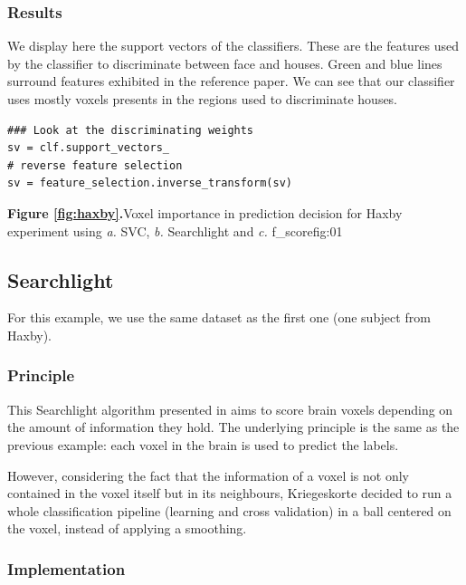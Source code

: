 \documentclass{frontiersSCNS} %
\begin{document}

\subsubsection{Results}

We display here the support vectors of the classifiers. These are the features
used by the classifier to discriminate between face and houses. Green and blue
lines surround features exhibited in the reference paper. We can see that our
classifier uses mostly voxels presents in the regions used to discriminate
houses.

\begin{lstlisting}
### Look at the discriminating weights
sv = clf.support_vectors_
# reverse feature selection
sv = feature_selection.inverse_transform(sv)
\end{lstlisting}

\textbf{Figure \ref{fig:haxby}.}{Voxel importance in prediction decision for Haxby experiment
using \textit{a.} SVC, \textit{b.} Searchlight and \textit{c.} f\_score}{fig:01}

\subsection{Searchlight}
\label{searchlight}
For this example, we use the same dataset as the first one (one subject from
Haxby).

\subsubsection{Principle}

This Searchlight algorithm presented in \cite{kriegeskorte2006} aims to score
brain voxels depending on the amount of information they hold. The underlying
principle is the same as the previous example: each voxel in the brain is used
to predict the labels.

However, considering the fact that the information of a voxel is not only
contained in the voxel itself but in its neighbours, Kriegeskorte decided to run
a whole classification pipeline (learning and cross validation) in a ball
centered on the voxel, instead of applying a smoothing.

\subsubsection{Implementation}
\end{document}
